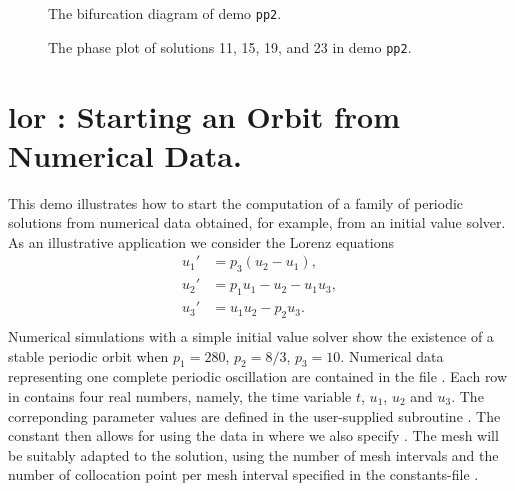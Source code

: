 \documentclass[12pt]{report}
\begin{document}
\begin{figure}[p]
\epsfysize 9.0cm
\centerline{}
\caption{The bifurcation diagram of demo {\tt pp2}.}
\label{fig:pp2_1}
\end{figure}

\begin{figure}[p]
\epsfysize 9.0cm
\centerline{}
\caption{The phase plot of solutions 11, 15, 19, and 23 in demo {\tt pp2}.}
\label{fig:pp2_2}
\end{figure}


\newpage
\section{ lor : Starting an Orbit from Numerical Data.} \label{sec:Demos_lor}
This demo illustrates how to start the computation of a family of
periodic solutions from numerical data obtained, for example, from an
initial value solver.
As an illustrative application we consider the Lorenz equations
\begin{equation} \begin{array}{cl}
  u_1' &=  p_3 (u_2 - u_1), \\
  u_2' &=  p_1 u_1 - u_2 - u_1 u_3,  \\
  u_3' &=  u_1 u_2 - p_2 u_3. \\\end{array} \end{equation}
Numerical simulations with a simple initial value solver show the
existence of a stable periodic orbit when $p_1=280$, $p_2=8/3$, $p_3=10$.
Numerical data representing one complete periodic oscillation are
contained in the file . 
Each row in  contains four real numbers, namely,
the time variable $t$, $u_1$, $u_2$ and $u_3$.
The correponding parameter values are defined in the user-supplied subroutine
.
The \AUTO constant  then allows for using
the data in  where we also specify .
The mesh will be suitably adapted to the solution, using the number of
mesh intervals  and the number of collocation point per mesh
interval  specified in the constants-file .
\end{document}
